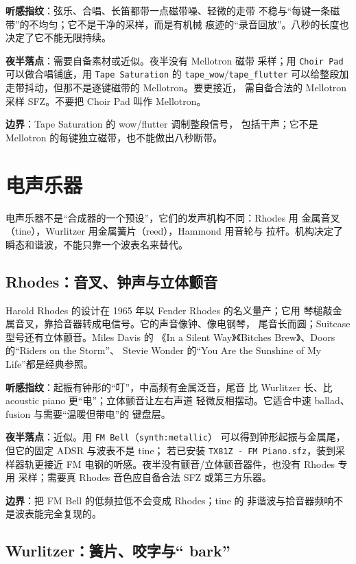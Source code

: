 \textbf{听感指纹}：弦乐、合唱、长笛都带一点磁带噪、轻微的走带
不稳与“每键一条磁带”的不均匀；它不是干净的采样，而是有机械
痕迹的“录音回放”。八秒的长度也决定了它不能无限持续。

\textbf{夜半落点}：需要自备素材或近似。夜半没有 Mellotron 磁带
采样；用 \texttt{Choir Pad} 可以做合唱铺底，用
\texttt{Tape Saturation} 的 \texttt{tape\_wow}/\texttt{tape\_flutter}
可以给整段加走带抖动，但那不是逐键磁带的 Mellotron。要更接近，
需自备合法的 Mellotron 采样 SFZ。不要把 Choir Pad 叫作
Mellotron。

\textbf{边界}：Tape Saturation 的 wow/flutter 调制整段信号，
包括干声；它不是 Mellotron 的每键独立磁带，也不能做出八秒断带。

\section{电声乐器}
\label{sec:iconic-electric}

电声乐器不是“合成器的一个预设”，它们的发声机构不同：Rhodes 用
金属音叉（tine），Wurlitzer 用金属簧片（reed），Hammond 用音轮与
拉杆。机构决定了瞬态和谐波，不能只靠一个波表名来替代。

\subsection{Rhodes：音叉、钟声与立体颤音}
\label{sec:iconic-rhodes}

Harold Rhodes 的设计在 1965 年以 Fender Rhodes 的名义量产；它用
琴槌敲金属音叉，靠拾音器转成电信号。它的声音像钟、像电钢琴，
尾音长而圆；Suitcase 型号还有立体颤音。Miles Davis 的
《In a Silent Way》《Bitches Brew》、Doors 的“Riders on the Storm”、
Stevie Wonder 的“You Are the Sunshine of My Life”都是经典参照。

\textbf{听感指纹}：起振有钟形的“叮”，中高频有金属泛音，尾音
比 Wurlitzer 长、比 acoustic piano 更“电”；立体颤音让左右声道
轻微反相摆动。它适合中速 ballad、fusion 与需要“温暖但带电”的
键盘层。

\textbf{夜半落点}：近似。用 \texttt{FM Bell}（\texttt{synth:metallic}）
可以得到钟形起振与金属尾，但它的固定 ADSR 与波表不是 tine；
若已安装 \texttt{TX81Z - FM Piano.sfz}，装到采样器轨更接近
FM 电钢的听感。夜半没有颤音/立体颤音器件，也没有 Rhodes 专用
采样；需要真 Rhodes 音色应自备合法 SFZ 或第三方乐器。

\textbf{边界}：把 FM Bell 的低频拉低不会变成 Rhodes；tine 的
非谐波与拾音器频响不是波表能完全复现的。

\subsection{Wurlitzer：簧片、咬字与“ bark”}
\label{sec:iconic-wurlitzer}

